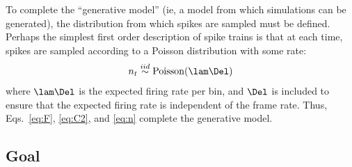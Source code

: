To complete the ``generative model'' (ie, a model from which simulations can be generated), the distribution from which spikes are sampled must be defined.  Perhaps the simplest first order description of spike trains is that at each time, spikes are sampled according to a Poisson distribution with some rate:
\begin{align} \label{eq:n}
	n_t \overset{iid}{\sim} \text{Poisson}(\lam \Del)
\end{align}
\noindent where $\lam \Del$ is the expected firing rate per bin, and $\Del$ is included to ensure that the expected firing rate is independent of the frame rate.  Thus, Eqs.~\eqref{eq:F}, \eqref{eq:C2}, and \eqref{eq:n} complete the generative model.  






\subsection{Goal} \label{sec:goal}

